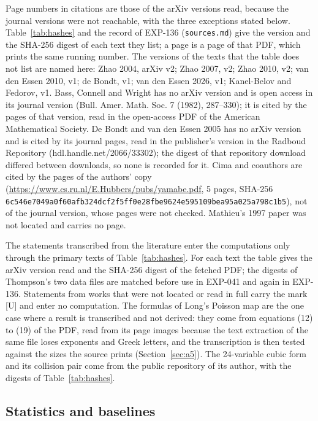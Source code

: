 \documentclass[11pt]{article}
\theoremstyle{remark}
\newcommand{\EXP}[1]{\mbox{EXP-#1}}
\begin{document}
Page numbers in citations are those of the arXiv versions read, because the journal versions were not reachable, with the three exceptions stated below. Table~\ref{tab:hashes} and the record of \EXP{136} (\texttt{sources.md}) give the version and the SHA-256 digest of each text they list; a page is a page of that PDF, which prints the same running number. The versions of the texts that the table does not list are named here: Zhao 2004, arXiv v2; Zhao 2007, v2; Zhao 2010, v2; van den Essen 2010, v1; de Bondt, v1; van den Essen 2026, v1; Kanel-Belov and Fedorov, v1. Bass, Connell and Wright has no arXiv version and is open access in its journal version (Bull. Amer. Math. Soc. 7 (1982), 287--330); it is cited by the pages of that version, read in the open-access PDF of the American Mathematical Society. De Bondt and van den Essen 2005 has no arXiv version and is cited by its journal pages, read in the publisher's version in the Radboud Repository (hdl.handle.net/2066/33302); the digest of that repository download differed between downloads, so none is recorded for it. Cima and coauthors are cited by the pages of the authors' copy (\url{https://www.cs.ru.nl/E.Hubbers/pubs/yamabe.pdf}, 5 pages, SHA-256 \texttt{6c546e70\allowbreak 49a0f60a\allowbreak fb324dcf\allowbreak 2f5ff0e2\allowbreak 8fbe9624\allowbreak e595109b\allowbreak ea95a025\allowbreak a798c1b5}), not of the journal version, whose pages were not checked. Mathieu's 1997 paper was not located and carries no page.

The statements transcribed from the literature enter the computations only through the primary texts of Table~\ref{tab:hashes}. For each text the table gives the arXiv version read and the SHA-256 digest of the fetched PDF; the digests of Thompson's two data files are matched before use in \EXP{041} and again in \EXP{136}. Statements from works that were not located or read in full carry the mark [U] and enter no computation. The formulas of Long's Poisson map are the one case where a result is transcribed and not derived: they come from equations (12) to (19) of the PDF, read from its page images because the text extraction of the same file loses exponents and Greek letters, and the transcription is then tested against the sizes the source prints (Section~\ref{sec:a5}). The 24-variable cubic form and its collision pair come from the public repository of its author, with the digests of Table~\ref{tab:hashes}.



\subsection{Statistics and baselines}\label{sec:statistics}
\end{document}
